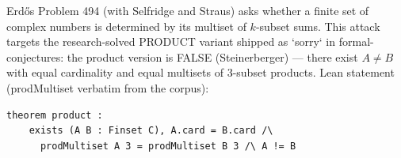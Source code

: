 Erdős Problem 494 (with Selfridge and Straus) asks whether a finite set of complex numbers
is determined by its multiset of $k$-subset sums. This attack targets the research-solved
PRODUCT variant shipped as `sorry` in formal-conjectures: the product version is FALSE
(Steinerberger) — there exist $A \ne B$ with equal cardinality and equal multisets of
3-subset products. Lean statement (prodMultiset verbatim from the corpus):
\begin{verbatim}
theorem product :
    exists (A B : Finset C), A.card = B.card /\
      prodMultiset A 3 = prodMultiset B 3 /\ A != B
\end{verbatim}

